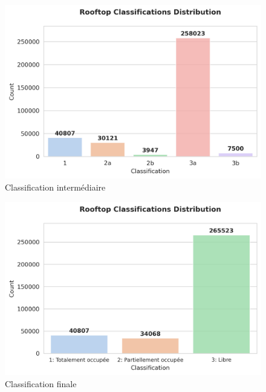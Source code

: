 \begin{figure}[H]
    \centering
    \includegraphics[width=1\linewidth]{02-main//figures/ch3/ch3_piste_exploree_classification_05_classification_intermediaire.png}
    \caption{Classification intermédiaire}
    \label{fig:ch3_piste_exploree_classification_05_classification_simplified}
\end{figure}

\begin{figure}[H]
    \centering
    \includegraphics[width=1\linewidth]{02-main//figures/ch3/ch3_piste_exploree_classification_06_classification_finale.png}
    \caption{Classification finale}
    \label{fig:ch3_piste_exploree_classification_06_classification_finale}
\end{figure}

